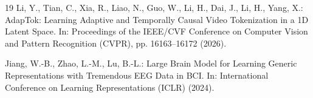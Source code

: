 \documentclass[runningheads]{llncs}
\begin{document}
\begin{thebibliography}{19}
Li, Y., Tian, C., Xia, R., Liao, N., Guo, W., Li, H., Dai, J., Li, H., Yang, X.:
AdapTok: Learning Adaptive and Temporally Causal Video Tokenization in a 1D Latent Space.
In: Proceedings of the IEEE/CVF Conference on Computer Vision and Pattern Recognition (CVPR), pp. 16163--16172 (2026).

Jiang, W.-B., Zhao, L.-M., Lu, B.-L.:
Large Brain Model for Learning Generic Representations with Tremendous EEG Data in BCI.
In: International Conference on Learning Representations (ICLR) (2024).

\end{thebibliography}
\end{document}
